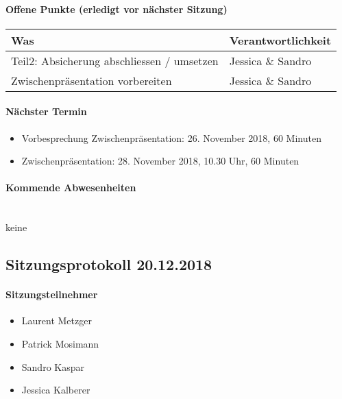\paragraph{Offene Punkte (erledigt vor nächster Sitzung)} \mbox{}
\begin{table}[H]
	\centering
	\begin{tabularx}{\textwidth}{X | p{4.5cm}}
		\rowcolor{gray!50}
		\textbf{Was} & \textbf{Verantwortlichkeit} \\
		\hline	
		Teil2: Absicherung abschliessen / umsetzen & Jessica \& Sandro \\
		Zwischenpräsentation vorbereiten & Jessica \& Sandro \\
	\end{tabularx}
	\label{tab:my-label}
\end{table}

\paragraph{Nächster Termin}
\begin{itemize}	
	\item Vorbesprechung Zwischenpräsentation: 26. November 2018, 60 Minuten
	\item Zwischenpräsentation: 28. November 2018, 10.30 Uhr, 60 Minuten
\end{itemize}

\paragraph{Kommende Abwesenheiten} \mbox{}\\
keine


\newpage






\subsection{Sitzungsprotokoll 20.12.2018}

\paragraph{Sitzungsteilnehmer}
\begin{itemize}	
	\item Laurent Metzger
	\item Patrick Mosimann
	\item Sandro Kaspar
	\item Jessica Kalberer
\end{itemize}

